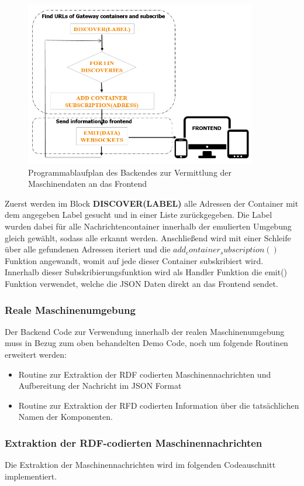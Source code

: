 \documentclass[
	12pt,								%
	DIV10,
	a4paper,         		%
	oneside,						%
	parskip=half,				%
	headings=normal,			%
	listof=totoc,					%
	bibliography=totoc,						%
	index=totoc,						%
	final								%
]{scrartcl}
\begin{document}
\begin{figure}[H]
\centering
\includegraphics[width=0.9\textwidth]{backendDemo}
\caption{Programmablaufplan des Backendes zur Vermittlung der Maschinendaten an das Frontend}
\label{ab2}
\end{figure}
Zuerst werden im Block \textbf{DISCOVER(LABEL)} alle Adressen der Container mit dem angegeben Label gesucht und in einer Liste zurückgegeben. Die Label wurden dabei für alle Nachrichtencontainer innerhalb der emulierten Umgebung gleich gewählt, sodass alle erkannt werden. Anschließend wird mit einer Schleife über alle gefundenen Adressen iteriert und die $add_container_subscription()$ Funktion angewandt, womit auf jede dieser Container subskribiert wird. Innerhalb dieser Subskribierungsfunktion wird als Handler Funktion die emit() Funktion verwendet, welche die JSON Daten direkt an das Frontend sendet.
\newpage
\subsubsection{Reale Maschinenumgebung}
Der Backend Code zur Verwendung innerhalb der realen Maschinenumgebung muss in Bezug zum oben behandelten Demo Code, noch um folgende Routinen erweitert werden:
\begin{itemize}
\item Routine zur Extraktion der RDF codierten Maschinennachrichten und Aufbereitung der Nachricht im JSON Format
\item Routine zur Extraktion der RFD codierten Information über die tatsächlichen Namen der Komponenten.
\end{itemize}
\subsubsection*{Extraktion der RDF-codierten Maschinennachrichten}
Die Extraktion der Maschinennachrichten wird im folgenden Codeauschnitt implementiert.
\end{document}
